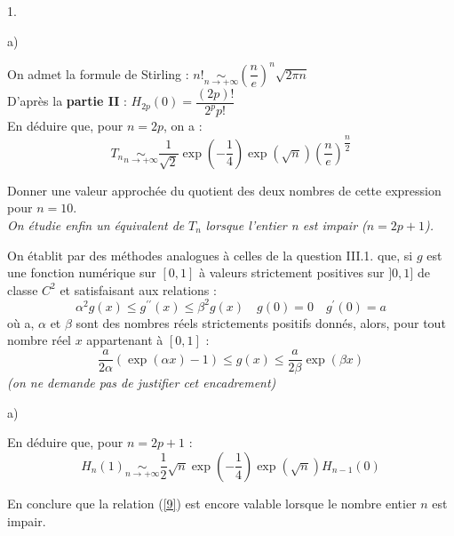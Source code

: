 \documentclass[11pt]{article}%
\begin{document}
\begin{noliste}{1.}
\begin{noliste}{a)}
\item On admet la formule de Stirling : $n!\underset{n\rightarrow +
\infty }{\sim }(\dfrac{n}{e})^{n}\sqrt{2\pi n}$\\
D'après la \textbf{partie II} : $H_{2p}(0) = \dfrac{(2p)!}{2^{p}p!}$\\
En déduire que, pour $n = 2p$, on a : 
\begin{equation}
T_{n}\underset{n\rightarrow + \infty }{\sim }\dfrac{1}{\sqrt{2}}\exp
({-}\dfrac{1}{4})\exp (\sqrt{n})(\dfrac{n}{e})^{\dfrac{n}{2}} \label{9}
\end{equation}

\item Donner une valeur approchée du quotient des deux nombres de cette
expression pour $n = 10$.\\
\textit{On étudie enfin un équivalent de }$T_{n}$ \textit{lorsque
l'entier n
est impair (}$n = 2p + 1$\textit{).}
\end{noliste}

\item On établit par des méthodes analogues à celles de la question
III.1.
que, si $g$ est une fonction numérique sur $[0,1]$ à valeurs
strictement
positives sur $]0,1]$ de classe $C^{2}$ et satisfaisant aux relations
:\begin{equation}
\alpha ^{2}g(x)\leq g^{\prime \prime }(x)\leq \beta ^{2}g(x)\quad
g(0) = 0\quad g^{\prime }(0) = a \label{10}
\end{equation}où a, $\alpha $ et $\beta $ sont des nombres réels
strictements positifs donnés, alors, pour tout nombre réel $x$
appartenant à $[0,1]$ :
\[
\dfrac{a}{2\alpha }(\exp (\alpha x)-1)\leq g(x)\leq \dfrac{a}{2\beta
}\exp (\beta x)
\]
\textit{(on ne demande pas de justifier cet encadrement)}

\begin{noliste}{a)}
 \setlength{\itemsep}{2mm}
\item En déduire que, pour $n = 2p + 1$ :
\[
H_{n}(1)\underset{n\rightarrow + \infty }{\sim
}\dfrac{1}{2}\sqrt{n}\exp (-\dfrac{1}{4})\exp (\sqrt{n})H_{n-1}(0)
\]

\item En conclure que la relation (\ref{9}) est encore valable lorsque
le
nombre entier $n$ est impair.
\end{noliste}
\end{noliste}

\label{fin}
\end{document}

